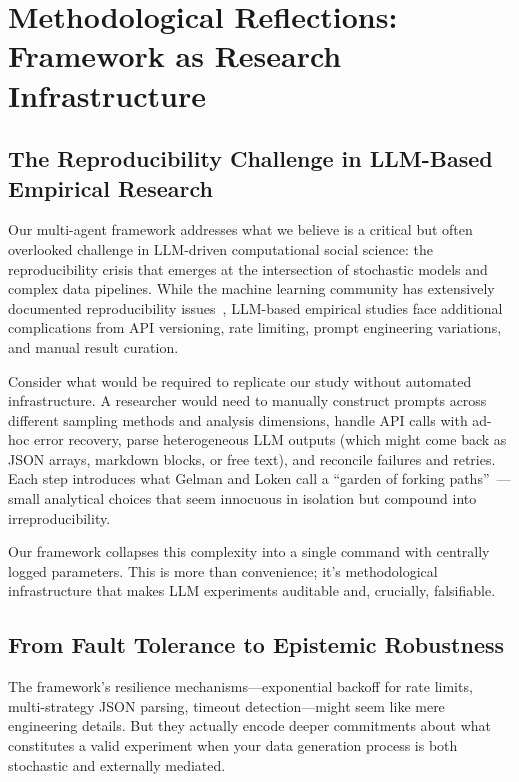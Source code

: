 \section{Methodological Reflections: Framework as Research Infrastructure}\label{sec:framework-role}

\subsection{The Reproducibility Challenge in LLM-Based Empirical Research}

Our multi-agent framework addresses what we believe is a critical but often overlooked challenge in LLM-driven computational social science: the reproducibility crisis that emerges at the intersection of stochastic models and complex data pipelines. While the machine learning community has extensively documented reproducibility issues~\cite{gundersen2018state}, LLM-based empirical studies face additional complications from API versioning, rate limiting, prompt engineering variations, and manual result curation. 

Consider what would be required to replicate our study without automated infrastructure. A researcher would need to manually construct prompts across different sampling methods and analysis dimensions, handle API calls with ad-hoc error recovery, parse heterogeneous LLM outputs (which might come back as JSON arrays, markdown blocks, or free text), and reconcile failures and retries. Each step introduces what Gelman and Loken call a ``garden of forking paths''~\cite{gelman2013garden}---small analytical choices that seem innocuous in isolation but compound into irreproducibility. 

Our framework collapses this complexity into a single command with centrally logged parameters. This is more than convenience; it's methodological infrastructure that makes LLM experiments auditable and, crucially, falsifiable.

\subsection{From Fault Tolerance to Epistemic Robustness}

The framework's resilience mechanisms---exponential backoff for rate limits, multi-strategy JSON parsing, timeout detection---might seem like mere engineering details. But they actually encode deeper commitments about what constitutes a valid experiment when your data generation process is both stochastic and externally mediated.

